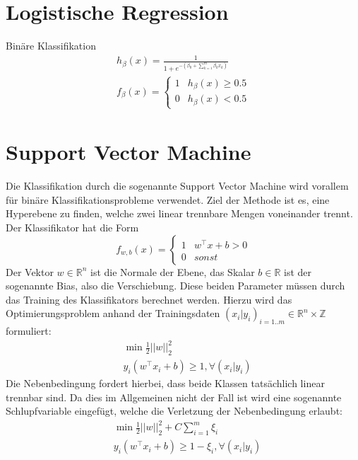\section{Logistische Regression}
Bin\"are Klassifikation
\begin{eqnarray*}
 h_{\beta}(x)=\frac{1}{1+e^{- (\beta_0+ \sum_{k=1}^m \beta_k x_{k}) }} \\
 f_{\beta}(x)= 
 \begin{cases}
  1 & h_{\beta}(x) \geq 0.5 \\
  0 & h_{\beta}(x) < 0.5
 \end{cases}
\end{eqnarray*}



\section{Support Vector Machine}
Die Klassifikation durch die sogenannte Support Vector Machine wird vorallem f\"ur bin\"are Klassifikationsprobleme verwendet. Ziel der Methode ist es, eine Hyperebene zu finden, welche zwei linear trennbare Mengen voneinander trennt. Der Klassifikator hat die Form
\begin{equation*}
 f_{w, b}(x) = 
 \begin{cases}
  1 & w^\intercal x+b>0 \\
  0 & sonst
 \end{cases}
\end{equation*}
 Der Vektor \(w \in \mathbb{R}^n \) ist die Normale der Ebene, das Skalar \(b \in \mathbb{R}\) ist der sogenannte Bias, also die Verschiebung. Diese beiden Parameter m\"ussen durch das Training des Klassifikators berechnet werden. Hierzu wird das Optimierungsproblem anhand der Trainingsdaten \( (x_i | y_i)_{i=1..m} \in \mathbb{R}^n \times \mathbb{Z} \) formuliert:
\begin{eqnarray*}
 & \min \frac{1}{2}||w||_2^2 \\
 & y_i(w^\intercal x_i+b) \geq 1, \forall (x_i | y_i)
\end{eqnarray*}
Die Nebenbedingung fordert hierbei, dass beide Klassen tats\"achlich linear trennbar sind. Da dies im Allgemeinen nicht der Fall ist wird eine sogenannte Schlupfvariable eingef\"ugt, welche die Verletzung der Nebenbedingung erlaubt:
\begin{eqnarray*}
 &\min \frac{1}{2}||w||_2^2+C \sum_{i=1}^m \xi_i \\
 &y_i(w^\intercal x_i+b) \geq 1-\xi_i, \forall (x_i | y_i)
\end{eqnarray*}

